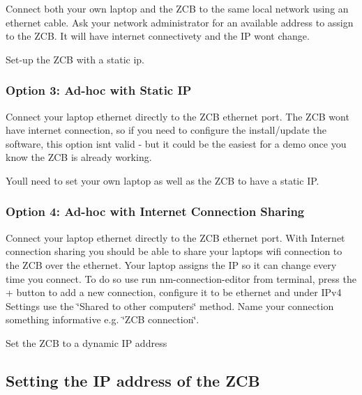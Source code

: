 Connect both your own laptop and the Z\+CB to the same local network using an ethernet cable. Ask your network administrator for an available address to assign to the Z\+CB. It will have internet connectivety and the IP won\textquotesingle{}t change.

Set-\/up the Z\+CB with a static ip.

\subsubsection*{Option 3\+: Ad-\/hoc with Static IP}

Connect your laptop ethernet directly to the Z\+CB ethernet port. The Z\+CB won\textquotesingle{}t have internet connection, so if you need to configure the install/update the software, this option isn\textquotesingle{}t valid -\/ but it could be the easiest for a demo once you know the Z\+CB is already working.

You\textquotesingle{}ll need to set your own laptop as well as the Z\+CB to have a static IP.

\subsubsection*{Option 4\+: Ad-\/hoc with Internet Connection Sharing}

Connect your laptop ethernet directly to the Z\+CB ethernet port. With Internet connection sharing you should be able to share your laptops wifi connection to the Z\+CB over the ethernet. Your laptop assigns the IP so it can change every time you connect. To do so use run {\ttfamily nm-\/connection-\/editor} from terminal, press the {\ttfamily +} button to add a new connection, configure it to be ethernet and under {\ttfamily I\+Pv4 Settings} use the \char`\"{}\+Shared to other computers\char`\"{} method. Name your connection something informative e.\+g. \char`\"{}\+Z\+C\+B connection\char`\"{}.

Set the Z\+CB to a dynamic IP address

\subsection*{Setting the IP address of the Z\+CB}

